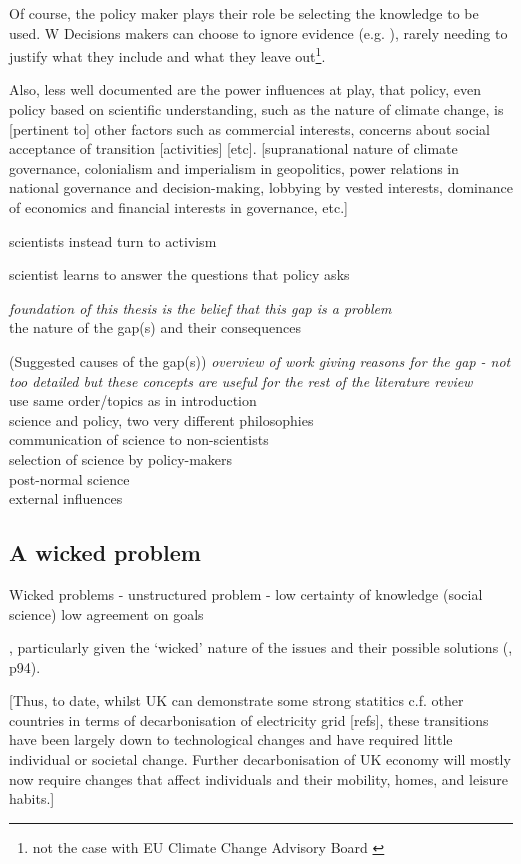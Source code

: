 Of course, the policy maker plays their role be selecting the knowledge to be used. W  Decisions makers can choose to ignore evidence (e.g. \cite{TennoyHLN2016}), rarely needing to justify what they include and what they leave out\footnote{not the case with EU Climate Change Advisory Board \cite{WardmanE2023}}.


Also, less well documented are the power influences at play, that policy, even policy based on scientific understanding, such as the nature of climate change, is [pertinent to] other factors such as commercial interests, concerns about social acceptance of transition [activities] [etc]. [supranational nature of climate governance, colonialism and imperialism in geopolitics, power relations in national governance and decision-making, lobbying by vested interests, dominance of economics and financial interests in governance, etc.]

scientists instead turn to activism \cite{Pivovarchuk2024,GregoryBW2024}

scientist learns to answer the questions that policy asks \cite{Gerber2023}

\emph{foundation of this thesis is the belief that this gap is a problem} \\
the nature of the gap(s) and their consequences

(Suggested causes of the gap(s))
\emph{overview of work giving reasons for the gap - not too detailed but these concepts are useful for the rest of the literature review} \\
use same order/topics as in introduction\\
science and policy, two very different philosophies\\
communication of science to non-scientists\\
selection of science by policy-makers\\
post-normal science\\
external influences

\subsection{A wicked problem}
Wicked problems \cite{RittelW1973}
\cite{WesselinkH2020} - unstructured problem - low certainty of knowledge (social science) low agreement on goals

, particularly given the `wicked' nature of the issues and their possible solutions (\cite{Cairney2016}, p94). 

[Thus, to date, whilst UK can demonstrate some strong statitics c.f. other countries in terms of decarbonisation of electricity grid [refs], these transitions have been largely down to technological changes and have required little individual or societal change. Further decarbonisation of UK economy will mostly now require changes that affect individuals and their mobility, homes, and leisure habits.]

